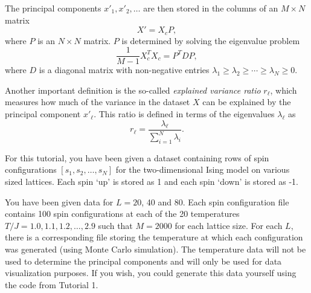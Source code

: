 \documentclass[letterpaper]{scrartcl}
\begin{document}
The principal components $x'_1, x'_2, \ldots$ are then stored in the columns of an $M \times N$ matrix 
\begin{equation}
X' = X_c P,
\end{equation} 
where $P$ is an $N \times N$ matrix. 
$P$ is determined by solving the eigenvalue problem
\begin{equation}
\frac{1}{M-1}X_c^T X_c = P^T D P,
\end{equation}
where $D$ is a diagonal matrix with non-negative entries $\lambda_1 \geq \lambda_2 \geq \cdots \geq \lambda_N \geq 0$.

Another important definition is the so-called \emph{explained variance ratio} $r_\ell$, which measures how much of the variance in the dataset $X$ 
can be explained by the principal component $x'_\ell$. 
This ratio is defined in terms of the eigenvalues $\lambda_\ell$ as
\begin{equation}
r_\ell = \frac{\lambda_\ell}{ \sum_{i=1}^N \lambda_i}.
\end{equation}

For this tutorial, you have been given a dataset containing rows of spin configurations 
$[s_1, s_2, \ldots, s_{N}]$ 
for the two-dimensional Ising model on various sized lattices.
Each spin `up' is stored as 1 and each spin `down' is stored as -1.

You have been given data for $L=20$, 40 and 80. 
Each spin configuration file contains 100 spin configurations at each of the 20 temperatures $T/J = 1.0, 1.1, 1.2, \ldots, 2.9$ such that $M=2000$ for each lattice size.
For each $L$, there is a corresponding file storing the temperature at which each configuration was generated 
(using Monte Carlo simulation).
The temperature data will not be used to determine the principal components and will only be used for data visualization purposes.
If you wish, you could generate this data yourself using the code from Tutorial 1.

\end{document}
